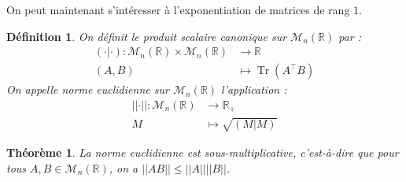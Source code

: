 \documentclass[a4paper]{article}
\newtheorem*{theorem}{Théorème}
\newtheorem*{definition}{Définition}
\begin{document}
On peut maintenant s'intéresser à l'exponentiation de matrices de rang $1$.

\begin{definition}
    On définit le produit scalaire canonique sur $\mathcal{M}_n(\mathbb{R})$ par :
    \begin{align*}
    \left(\cdot|\cdot\right) : \mathcal{M}_{n}(\mathbb{R}) \times \mathcal{M}_{n}(\mathbb{R}) &\longrightarrow \mathbb{R}\\
    (A, B) &\longmapsto \operatorname{Tr}\left(A^\top B\right)
    \end{align*}
    On appelle norme euclidienne sur $\mathcal{M}_n(\mathbb{R})$ l'application :
    \begin{align*}
    \left|\left|\cdot\right|\right| : \mathcal{M}_{n}(\mathbb{R}) &\longrightarrow \mathbb{R_+}\\
    M &\longmapsto \sqrt{\left(M|M\right)}
    \end{align*}
\end{definition}

\begin{theorem}
    La norme euclidienne est sous-multiplicative, c'est-à-dire que pour tous $A, B \in \mathcal{M}_n(\mathbb{R})$, on a $\left|\left| AB \right|\right| \leq \left|\left| A \right|\right| \left|\left| B \right|\right|$.
\end{theorem}
\end{document}
